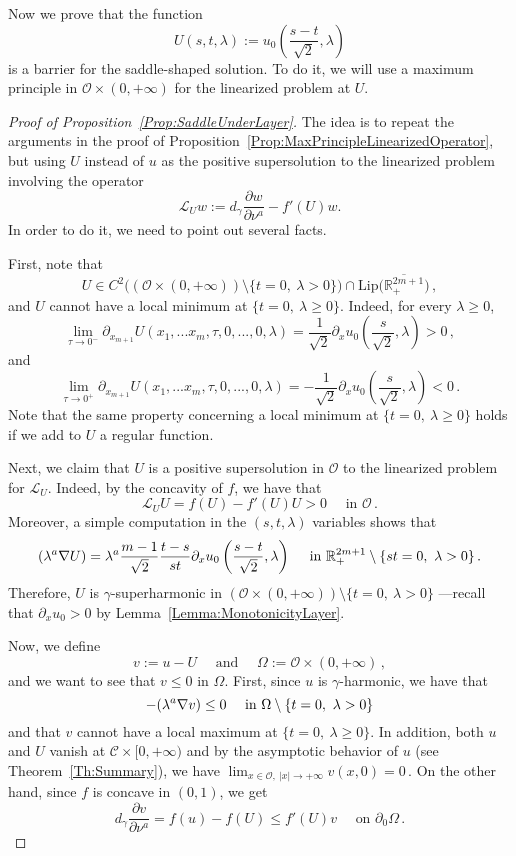 \documentclass[twoside,leqno,symbols-for-thanks, draft]{rmi}
\numberwithin{equation}{section}
\theoremstyle{definition}
\newcommand{\con}[1]{\mathbb{#1}}
\newcommand{\R}{\con{R}} %
\newcommand{\ccal}{\mathscr{C}}
\newcommand{\ocal}{\mathcal{O}}
\newcommand{\s}{\gamma}
\newcommand{\Lip}{\mathrm{Lip}}
\newcommand{\bpar}[1]{\left ( {#1}\right )}
\let\div\relax
\DeclareMathOperator{\div}{div}
\begin{document}
Now we prove that the function 
$$
U(s,t,\lambda) := u_0 \left( \frac{s-t}{\sqrt{2}}, \lambda\right)
$$ 
is a barrier for the saddle-shaped solution. To do it, we will use a maximum principle in $\ocal \times (0,+\infty)$ for the linearized problem at $U$.


\begin{proof}[Proof of Proposition~\ref{Prop:SaddleUnderLayer}]
	The idea is to repeat the arguments in the proof of Proposition~\ref{Prop:MaxPrincipleLinearizedOperator}, but using $U$ instead of $u$ as the positive supersolution to the linearized problem involving the operator 
	$$
	\mathscr{L}_U w:= d_\s \dfrac{\partial w}{\partial \nu^a}  -f'(U)w. 
	$$ 
	In order to do it, we need to point out several facts.
	
	First, note that 
	$$
	U\in C^2\big( (\ocal\times (0,+\infty))\setminus \{t=0,\ \lambda > 0\} \big ) \cap \Lip \big( \overline{\R^{2m+1}_+}\big )\,,
	$$
	and $U$ cannot have a local minimum at $\{t=0,\ \lambda \geq 0\}$. Indeed, for every $\lambda \geq 0$,
	$$
	\lim_{\tau\to 0^-} \partial_{x_{m+1}}  U(x_1,...x_m,\tau,0,...,0,\lambda) = \frac{1}{\sqrt{2}}\partial_xu_0\left(\frac{s}{\sqrt{2}},\lambda\right)>0\,, 
	$$
	and
	$$
	\lim_{\tau\to 0^+} \partial_{x_{m+1}} U(x_1,...x_m,\tau,0,...,0,\lambda) = -\frac{1}{\sqrt{2}}\partial_xu_0\left(\frac{s}{\sqrt{2}},\lambda\right) <0\,.
	$$
	Note that the same property concerning a local minimum at $\{t=0,\ \lambda \geq 0\}$ holds if we add to $U$ a regular function.
	
	Next, we claim that $U$ is a positive supersolution in $\ocal$ to the linearized problem for $\mathscr{L}_U$. Indeed, by the concavity of $f$, we have that
	$$
	\mathscr{L}_U U  = f(U) - f'(U)U> 0 \quad \text{ in } \ocal\,.
	$$
	Moreover, a simple computation in the $(s, t, \lambda)$ variables shows that
	\begin{equation}
	\label{Eq:EqForULayer}
	\div (\lambda^a \nabla U) = \lambda^a \dfrac{m-1}{\sqrt{2}} \dfrac{t-s}{st} \partial_x u_0 \bpar{\dfrac{s-t}{\sqrt{2}}, \lambda}  \quad \text{ in } \R^{2m + 1}_+ \setminus \{st=0,\ \lambda >0\}\,.
	\end{equation}
	Therefore, $U$ is $\s$-superharmonic in $ (\ocal \times (0, +\infty) )\setminus \{t=0,\ \lambda > 0\}$ ---recall that $ \partial_x u_0 > 0$ by Lemma~\ref{Lemma:MonotonicityLayer}. 
	
	
	Now, we define 
	$$ v:= u - U \quad \text{ and } \quad \Omega :=  \ocal \times (0, +\infty)\,,
	$$
	and we want to see that $v\leq 0$ in $\Omega$. First, since $u$ is $\s$-harmonic, we have that 
	$$ 
	-\div (\lambda^a \nabla v) \leq 0 \quad \text{ in }\Omega \setminus \{t=0,\ \lambda > 0\}
	$$
	and that $v$ cannot have a local maximum at $\{t=0,\ \lambda \geq 0\}$. In addition, both $u$ and $U$ vanish at $\ccal \times [0,+\infty)$ and by the asymptotic behavior of $u$ (see Theorem~\ref{Th:Summary}), we have $\lim_{x\in  \ocal,\ |x|\to +\infty} v(x,0) = 0\,$. On the other hand, since $f$ is concave in $(0,1)$, we get 
	$$
	d_\s \dfrac{\partial v}{\partial \nu^a}  = f(u) - f(U) \leq f'(U)v \quad \text{ on } \partial_0 \Omega\,.
	$$
	

\end{proof}
\end{document}
